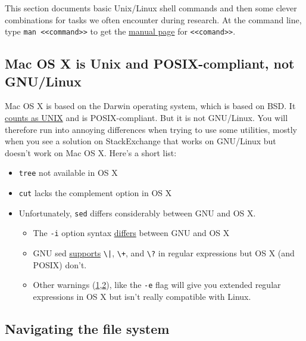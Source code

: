 \label{entry:unixshelltips}

This section documents basic Unix/Linux shell commands and then some clever combinations for tasks we often encounter during research.
At the command line, type \texttt{man <<command>>} to get the \href{https://en.wikipedia.org/wiki/Man_page}{manual page} for \texttt{<<comand>>}.

\subsection{Mac OS X is Unix and POSIX-compliant, not GNU/Linux}

Mac OS X is based on the Darwin operating system, which is based on BSD.
It \href{https://www.opengroup.org/openbrand/register/apple.htm}{counts as UNIX} and is POSIX-compliant.
But it is not GNU/Linux.
You will therefore run into annoying differences when trying to use some utilities, mostly when you see a solution on StackExchange that works on GNU/Linux but doesn't work on Mac OS X.
Here's a short list:
\begin{itemize}
\item \texttt{tree} not available in OS X
\item \texttt{cut} lacks the complement option in OS X
\item Unfortunately, \texttt{sed} differs considerably between GNU and OS X.
\begin{itemize}
	\item The \texttt{-i} option syntax \href{https://stackoverflow.com/questions/2320564/i-need-my-sed-i-command-for-in-place-editing-to-work-with-both-gnu-sed-and-bsd}{differs} between GNU and OS X
	\item GNU sed \href{https://unix.stackexchange.com/questions/13711/differences-between-sed-on-mac-osx-and-other-standard-sed}{supports} \texttt{\textbackslash|}, \texttt{\textbackslash+}, and \texttt{\textbackslash?} in regular expressions but OS X (and POSIX) don't.
	\item Other warnings (\href{https://unix.stackexchange.com/a/131940}{1},\href{https://stackoverflow.com/questions/1227174/sed-on-os-x-cant-seem-to-use-in-regexps}{2}), like the \texttt{-e} flag will give you extended regular expressions in OS X but isn't really compatible with Linux.
\end{itemize}


\end{itemize}


\subsection{Navigating the file system}

